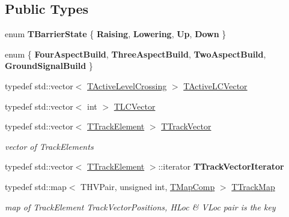 \subsection*{Public Types}
\begin{DoxyCompactItemize}
\item 
\mbox{\label{class_t_track_a4c2e42d85ed9151b4983f079f11d6d79}} 
enum {\bfseries T\+Barrier\+State} \{ {\bfseries Raising}, 
{\bfseries Lowering}, 
{\bfseries Up}, 
{\bfseries Down}
 \}
\item 
\mbox{\label{class_t_track_a05bacf165698f9502dc7287b01ece848}} 
enum \{ {\bfseries Four\+Aspect\+Build}, 
{\bfseries Three\+Aspect\+Build}, 
{\bfseries Two\+Aspect\+Build}, 
{\bfseries Ground\+Signal\+Build}
 \}
\item 
typedef std\+::vector$<$ \mbox{\hyperlink{class_t_track_1_1_t_active_level_crossing}{T\+Active\+Level\+Crossing}} $>$ \mbox{\hyperlink{class_t_track_af124e944cfb44075f390cf5eceaf3e66}{T\+Active\+L\+C\+Vector}}
\item 
typedef std\+::vector$<$ int $>$ \mbox{\hyperlink{class_t_track_a84634d4f5d5ce1928526e8be27e74a72}{T\+L\+C\+Vector}}
\item 
\mbox{\label{class_t_track_ac64e15050a0faf07c1b7410d60cbcbe5}} 
typedef std\+::vector$<$ \mbox{\hyperlink{class_t_track_element}{T\+Track\+Element}} $>$ \mbox{\hyperlink{class_t_track_ac64e15050a0faf07c1b7410d60cbcbe5}{T\+Track\+Vector}}
\begin{DoxyCompactList}\small\item\em vector of Track\+Elements \end{DoxyCompactList}\item 
\mbox{\label{class_t_track_a87cc4e8b965e68fd9f02e3a1fc01b6bb}} 
typedef std\+::vector$<$ \mbox{\hyperlink{class_t_track_element}{T\+Track\+Element}} $>$\+::iterator {\bfseries T\+Track\+Vector\+Iterator}
\item 
\mbox{\label{class_t_track_ab03d3109c635a149c57812c89cec63a4}} 
typedef std\+::map$<$ T\+H\+V\+Pair, unsigned int, \mbox{\hyperlink{class_t_map_comp}{T\+Map\+Comp}} $>$ \mbox{\hyperlink{class_t_track_ab03d3109c635a149c57812c89cec63a4}{T\+Track\+Map}}
\begin{DoxyCompactList}\small\item\em map of Track\+Element Track\+Vector\+Positions, H\+Loc \& V\+Loc pair is the key \end{DoxyCompactList}\item 

\end{DoxyCompactItemize}
